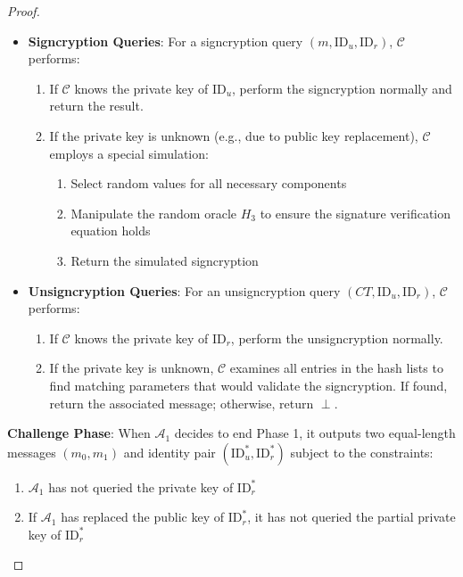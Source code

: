 \documentclass[10pt]{article}
\newtheorem{proof}{Proof}
\begin{document}
\begin{proof}
\begin{itemize}
    \item \textbf{Signcryption Queries}: For a signcryption query $(m, \text{ID}_u, \text{ID}_r)$, $\mathcal{C}$ performs:
    \begin{enumerate}
        \item If $\mathcal{C}$ knows the private key of $\text{ID}_u$, perform the signcryption normally and return the result.
        \item If the private key is unknown (e.g., due to public key replacement), $\mathcal{C}$ employs a special simulation:
        \begin{enumerate}
            \item Select random values for all necessary components
            \item Manipulate the random oracle $H_3$ to ensure the signature verification equation holds
            \item Return the simulated signcryption
        \end{enumerate}
    \end{enumerate}
    
    \item \textbf{Unsigncryption Queries}: For an unsigncryption query $(CT, \text{ID}_u, \text{ID}_r)$, $\mathcal{C}$ performs:
    \begin{enumerate}
        \item If $\mathcal{C}$ knows the private key of $\text{ID}_r$, perform the unsigncryption normally.
        \item If the private key is unknown, $\mathcal{C}$ examines all entries in the hash lists to find matching parameters that would validate the signcryption. If found, return the associated message; otherwise, return $\perp$.
    \end{enumerate}
\end{itemize}

\textbf{Challenge Phase}:
When $\mathcal{A}_1$ decides to end Phase 1, it outputs two equal-length messages $(m_0, m_1)$ and identity pair $(\text{ID}_u^*, \text{ID}_r^*)$ subject to the constraints:
\begin{enumerate}
    \item $\mathcal{A}_1$ has not queried the private key of $\text{ID}_r^*$
    \item If $\mathcal{A}_1$ has replaced the public key of $\text{ID}_r^*$, it has not queried the partial private key of $\text{ID}_r^*$
\end{enumerate}


\end{proof}
\end{document}
